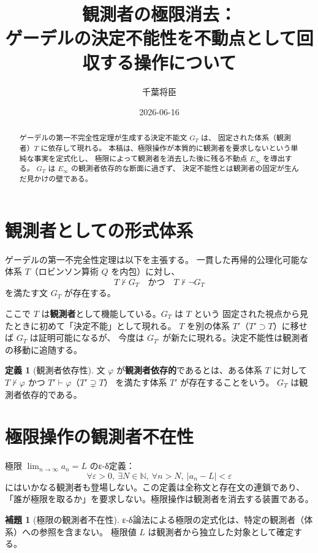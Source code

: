 \documentclass[11pt,a4paper]{article}
\title{観測者の極限消去：\\
ゲーデルの決定不能性を不動点として回収する操作について}
\author{千葉将臣}
\date{2026-06-16}
\theoremstyle{definition}
\newtheorem{definition}{定義}[section]
\newtheorem{lemma}{補題}[section]
\newcommand{\Einfty}{E_\infty}
\begin{document}
\maketitle

\begin{abstract}
ゲーデルの第一不完全性定理が生成する決定不能文 $G_T$ は、
固定された体系（観測者）$T$ に依存して現れる。
本稿は、極限操作が本質的に観測者を要求しないという単純な事実を定式化し、
極限によって観測者を消去した後に残る不動点 $\Einfty$ を導出する。
$G_T$ は $\Einfty$ の観測者依存的な断面に過ぎず、
決定不能性とは観測者の固定が生んだ見かけの壁である。
\end{abstract}

\section{観測者としての形式体系}

ゲーデルの第一不完全性定理は以下を主張する。
一貫した再帰的公理化可能な体系 $T$（ロビンソン算術 $Q$ を内包）に対し、
$$T \nvdash G_T \quad \text{かつ} \quad T \nvdash \neg G_T$$
を満たす文 $G_T$ が存在する。

ここで $T$ は\textbf{観測者}として機能している。$G_T$ は $T$ という
固定された視点から見たときに初めて「決定不能」として現れる。
$T$ を別の体系 $T'$（$T' \supset T$）に移せば $G_T$ は証明可能になるが、
今度は $G_{T'}$ が新たに現れる。決定不能性は観測者の移動に追随する。

\begin{definition}[観測者依存性]
文 $\varphi$ が\textbf{観測者依存的}であるとは、ある体系 $T$ に対して
$T \nvdash \varphi$ かつ $T' \vdash \varphi$（$T' \supsetneq T$）
を満たす体系 $T'$ が存在することをいう。
$G_T$ は観測者依存的である。
\end{definition}

\section{極限操作の観測者不在性}

極限 $\lim_{n \to \infty} a_n = L$ のε-δ定義：
$$\forall \varepsilon > 0,\ \exists N \in \mathbb{N},\ \forall n > N,\
|a_n - L| < \varepsilon$$
にはいかなる観測者も登場しない。この定義は全称文と存在文の連鎖であり、
「誰が極限を取るか」を要求しない。極限操作は観測者を消去する装置である。

\begin{lemma}[極限の観測者不在性]
ε-δ論法による極限の定式化は、特定の観測者（体系）への参照を含まない。
極限値 $L$ は観測者から独立した対象として確定する。
\end{lemma}
\end{document}
